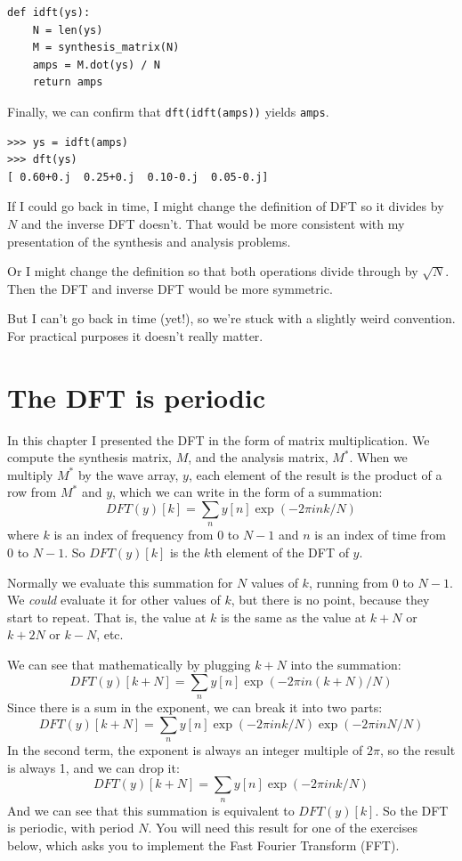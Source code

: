 \documentclass[12pt]{book}
\begin{document}
\begin{verbatim}
def idft(ys):
    N = len(ys)
    M = synthesis_matrix(N)
    amps = M.dot(ys) / N
    return amps
\end{verbatim}

Finally, we can confirm that {\tt dft(idft(amps))} yields {\tt amps}.

\begin{verbatim}
>>> ys = idft(amps)
>>> dft(ys)
[ 0.60+0.j  0.25+0.j  0.10-0.j  0.05-0.j]
\end{verbatim}

If I could go back in time, I might change the definition of
DFT so it divides by $N$ and the inverse DFT doesn't.  That would
be more consistent with my presentation of the synthesis and analysis
problems.

Or I might change the definition so that both operations divide
through by $\sqrt{N}$.  Then the DFT and inverse DFT would be
more symmetric.

But I can't go back in time (yet!), so we're stuck with a slightly
weird convention.  For practical purposes it doesn't really
matter.


\section{The DFT is periodic}

In this chapter I presented the DFT in the form of matrix multiplication.
We compute the synthesis matrix, $M$, and the analysis matrix, $M^*$.
When we multiply $M^{*}$ by the wave array, $y$, each element of the
result is the product of a row from $M^*$ and $y$, which we can
write in the form of a summation:
%
\[ DFT(y)[k] = \sum_n y[n] \exp(-2 \pi i n k / N) \]
%
where $k$ is an index of frequency from
$0$ to $N-1$ and $n$ is an index of time from $0$ to $N-1$.
So $DFT(y)[k]$ is the $k$th element of the DFT of $y$.

Normally we evaluate this summation for $N$ values of $k$, running from
0 to $N-1$.  We {\em could} evaluate it for other values of $k$, but
there is no point, because they start to repeat.  That is, the value at
$k$ is the same as the value at $k+N$ or $k+2N$ or $k-N$, etc.

We can see that mathematically by plugging $k+N$ into the summation:
%
\[ DFT(y)[k+N] = \sum_n y[n] \exp(-2 \pi i n (k+N) / N) \]
%
Since there is a sum in the exponent, we can break it into two parts:
%
\[ DFT(y)[k+N] = \sum_n y[n] \exp(-2 \pi i n k / N)  \exp(-2 \pi i n N / N) \]
%
In the second term, the exponent is always an integer multiple of
$2 \pi$, so the result is always 1, and we can drop it:
%
\[ DFT(y)[k+N] = \sum_n y[n] \exp(-2 \pi i n k / N) \]
%
And we can see that this summation is equivalent to $ DFT(y)[k]$.
So the DFT is periodic, with period $N$.  You will need this result
for one of the exercises below, which asks you to implement the Fast Fourier
Transform (FFT).
\end{document}
